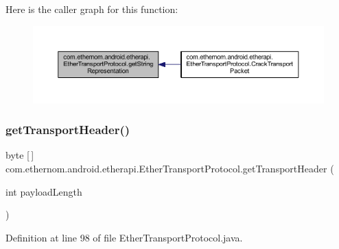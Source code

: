 Here is the caller graph for this function\+:\nopagebreak
\begin{figure}[H]
\begin{center}
\leavevmode
\includegraphics[width=350pt]{classcom_1_1ethernom_1_1android_1_1etherapi_1_1_ether_transport_protocol_aee2f3cf832c15ccf711a83a8269224d9_icgraph}
\end{center}
\end{figure}
\mbox{\label{classcom_1_1ethernom_1_1android_1_1etherapi_1_1_ether_transport_protocol_ae2c4357c0d53349f62bef02091b1577a}} 
\subsubsection{\texorpdfstring{get\+Transport\+Header()}{getTransportHeader()}}
{\footnotesize\ttfamily byte \mbox{[}$\,$\mbox{]} com.\+ethernom.\+android.\+etherapi.\+Ether\+Transport\+Protocol.\+get\+Transport\+Header (\begin{DoxyParamCaption}\item[{int}]{payload\+Length }\end{DoxyParamCaption})}



Definition at line 98 of file Ether\+Transport\+Protocol.\+java.

